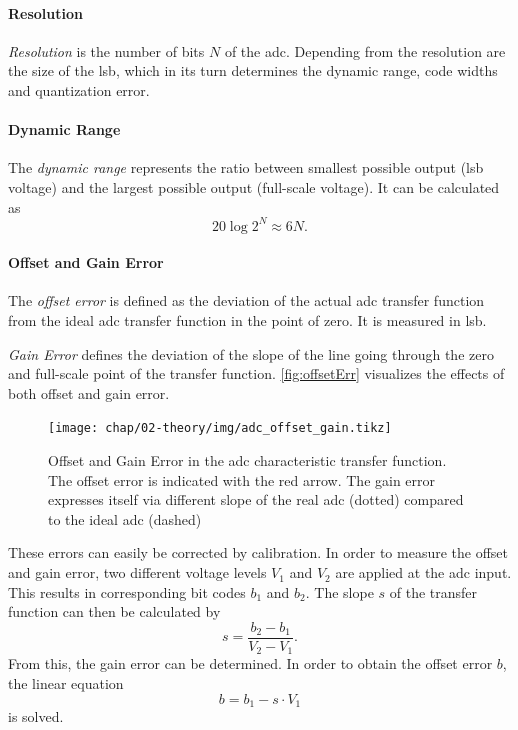 \paragraph{Resolution}
\textit{Resolution} is the number of bits $N$ of the \gls{adc}.
Depending from the resolution are the size of the \gls{lsb}, which in its turn determines the dynamic range, code widths and quantization error.
\paragraph{Dynamic Range}
The \textit{dynamic range} represents the ratio between smallest possible output (\gls{lsb} voltage) and the largest possible output (full-scale voltage).
It can be calculated as
\begin{equation}
	20 \log 2^{N} \approx 6N.
\end{equation}

\paragraph{Offset and Gain Error}
The \textit{offset error} is defined as the deviation of the actual \gls{adc} transfer function from the ideal \gls{adc} transfer function in the point of zero. It is measured in \gls{lsb}. 
 
\textit{Gain Error} defines the deviation of the slope of the line going through the zero and full-scale point of the transfer function. %
\autoref{fig:offsetErr} visualizes the effects of both offset and gain error. 
\begin{figure}[tbh]
	\centering
	\texttt{[image: chap/02-theory/img/adc\_offset\_gain.tikz]}
	\caption[Effects of Offset and Fain error in ADC]{Offset and Gain Error in the \gls{adc} characteristic transfer function. The offset error is indicated with the red arrow. The gain error expresses itself via different slope of the real \gls{adc} (dotted) compared to the ideal \gls{adc} (dashed)}
	\label{fig:offsetErr}
\end{figure}

These errors can easily be corrected by calibration. 
In order to measure the offset and gain error, two different voltage levels $V_1$ and $V_2$ are applied at the \gls{adc} input. 
This results in corresponding bit codes $b_1$ and $b_2$.
The slope $s$ of the transfer function can then be calculated by
\begin{equation}
	s = \frac{b_2 - b_1}{V_2 - V_1}.
\end{equation}
From this, the gain error can be determined.
In order to obtain the offset error $b$, the linear equation
\begin{equation}
	b = b_1 - s\cdot V_1
\end{equation}
is solved.


